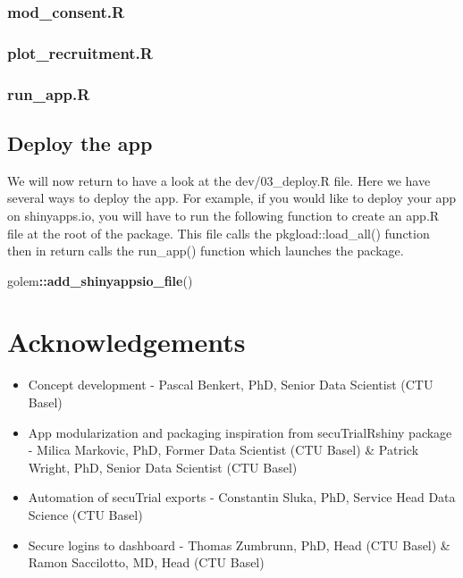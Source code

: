 \documentclass[]{article}
\newenvironment{Shaded}{\begin{snugshade}}{\end{snugshade}}
\newcommand{\KeywordTok}[1]{\textcolor[rgb]{0.13,0.29,0.53}{\textbf{#1}}}
\newcommand{\NormalTok}[1]{#1}
\newcommand{\OperatorTok}[1]{\textcolor[rgb]{0.81,0.36,0.00}{\textbf{#1}}}
\providecommand{\tightlist}{%
  \setlength{\itemsep}{0pt}\setlength{\parskip}{0pt}}
\begin{document}
\hypertarget{mod_consent.r}{%
\subsubsection{mod\_consent.R}\label{mod_consent.r}}

\hypertarget{plot_recruitment.r}{%
\subsubsection{plot\_recruitment.R}\label{plot_recruitment.r}}

\hypertarget{run_app.r}{%
\subsubsection{run\_app.R}\label{run_app.r}}

\hypertarget{deploy-the-app}{%
\subsection{\texorpdfstring{\textbf{Deploy the
app}}{Deploy the app}}\label{deploy-the-app}}

We will now return to have a look at the dev/03\_deploy.R file. Here we
have several ways to deploy the app. For example, if you would like to
deploy your app on shinyapps.io, you will have to run the following
function to create an app.R file at the root of the package. This file
calls the pkgload::load\_all() function then in return calls the
run\_app() function which launches the package.

\begin{Shaded}
\begin{Highlighting}[]

\NormalTok{golem}\OperatorTok{::}\KeywordTok{add_shinyappsio_file}\NormalTok{()}
\end{Highlighting}
\end{Shaded}

\hypertarget{acknowledgements}{%
\section{\texorpdfstring{\textbf{Acknowledgements}}{Acknowledgements}}\label{acknowledgements}}

\begin{itemize}
\tightlist
\item
  Concept development - Pascal Benkert, PhD, Senior Data Scientist (CTU
  Basel)
\item
  App modularization and packaging inspiration from secuTrialRshiny
  package - Milica Markovic, PhD, Former Data Scientist (CTU Basel) \&
  Patrick Wright, PhD, Senior Data Scientist (CTU Basel)
\item
  Automation of secuTrial exports - Constantin Sluka, PhD, Service Head
  Data Science (CTU Basel)
\item
  Secure logins to dashboard - Thomas Zumbrunn, PhD, Head (CTU Basel) \&
  Ramon Saccilotto, MD, Head (CTU Basel)
\end{itemize}
\end{document}
